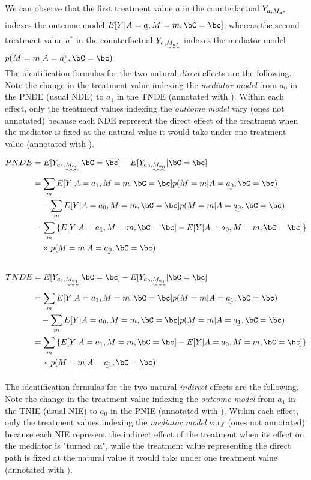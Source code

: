 \documentclass[dvipdfmx,10pt]{article}
\begin{document}
We can observe that the first treatment value \(a\) in the counterfactual \(Y_{\uwave{a},M_{a^{*}}}\) indexes the outcome model \(E[Y | A = \uwave{a}, M = m, \bC = \bc]\), whereas the second treatment value \(a^{*}\) in the counterfactual \(Y_{a,\uwave{M_{a^{*}}}}\) indexes the mediator model \(p(M = m | A = \uwave{a^{*}}, \bC = \bc)\).\\

The identification formulas for the two natural \emph{direct} effects are the following. Note the change in the treatment value indexing the \emph{mediator model} from \(a_{0}\) in the PNDE (usual NDE) to \(a_{1}\) in the TNDE (annotated with \uwave{~~~~}). Within each effect, only the treatment values indexing the \emph{outcome model} vary (ones not annotated) because each NDE represent the direct effect of the treatment when the mediator is fixed at the natural value it would take under one treatment value (annotated with \uwave{~~~~}).

\begin{align*}
  PNDE
  &= E[Y_{a_{1},\uwave{M_{a_{0}}}} | \bC = \bc] - E[Y_{a_{0},\uwave{M_{a_{0}}}} | \bC = \bc]\\
  &=     \sum_{m} E[Y | A = a_{1}, M = m, \bC = \bc] p(M = m | A = \uwave{a_{0}}, \bC = \bc)\\
  &~~~ - \sum_{m} E[Y | A = a_{0}, M = m, \bC = \bc] p(M = m | A = \uwave{a_{0}}, \bC = \bc)\\
  &= \sum_{m} \left\{ E[Y | A = a_{1}, M = m, \bC = \bc] - E[Y | A = a_{0}, M = m, \bC = \bc] \right\}\\
  &~~~ \times p(M = m | A = \uwave{a_{0}}, \bC = \bc)\\
  \\
  TNDE
  &= E[Y_{a_{1},\uwave{M_{a_{1}}}} | \bC = \bc] - E[Y_{a_{0},\uwave{M_{a_{1}}}} | \bC = \bc]\\
  &=     \sum_{m} E[Y | A = a_{1}, M = m, \bC = \bc] p(M = m | A = \uwave{a_{1}}, \bC = \bc)\\
  &~~~ - \sum_{m} E[Y | A = a_{0}, M = m, \bC = \bc] p(M = m | A = \uwave{a_{1}}, \bC = \bc)\\
  &= \sum_{m} \left\{ E[Y | A = a_{1}, M = m, \bC = \bc] - E[Y | A = a_{0}, M = m, \bC = \bc] \right\}\\
  &~~~ \times p(M = m | A = \uwave{a_{1}}, \bC = \bc)\\
\end{align*}

The identification formulas for the two natural \emph{indirect} effects are the following. Note the change in the treatment value indexing the \emph{outcome model} from \(a_{1}\) in the TNIE (usual NIE) to \(a_{0}\) in the PNIE (annotated with \uwave{~~~~}). Within each effect, only the treatment values indexing the \emph{mediator model} vary (ones not annotated) because each NIE represent the indirect effect of the treatment when its effect on the mediator is "turned on", while the treatment value representing the direct path is fixed at the natural value it would take under one treatment value (annotated with \uwave{~~~~}).
\end{document}
